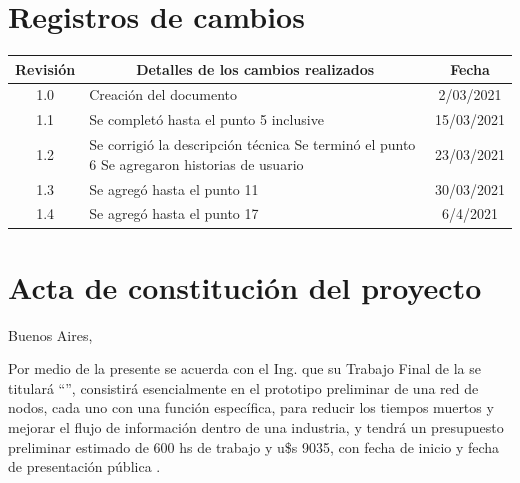 \documentclass[11pt]{charter}
\begin{document}
\maketitle
\thispagestyle{empty}
\pagebreak


\thispagestyle{empty}
{\setlength{\parskip}{0pt}
\tableofcontents{}
}
\pagebreak


\section{Registros de cambios}
\label{sec:registro}


\begin{table}[ht]
\label{tab:registro}
\centering
\begin{tabularx}{\linewidth}{@{}|c|X|c|@{}}
\hline
\rowcolor[HTML]{C0C0C0} 
Revisión & \multicolumn{1}{c|}{\cellcolor[HTML]{C0C0C0}Detalles de los cambios realizados} & Fecha      \\ \hline
1.0      & Creación del documento                                          & 2/03/2021 \\ \hline
1.1      & Se completó hasta el punto 5 inclusive & 15/03/2021 \\ \hline
1.2      & Se corrigió la descripción técnica\newline
           Se terminó el punto 6\newline
           Se agregaron historias de usuario & 23/03/2021 \\ \hline
1.3      & Se agregó hasta el punto 11      & 30/03/2021  \\ \hline
1.4     & Se agregó hasta el punto 17       & 6/4/2021 \\ \hline
\end{tabularx}
\end{table}

\pagebreak



\section{Acta de constitución del proyecto}
\label{sec:acta}

\begin{flushright}
Buenos Aires, \fechaInicioName
\end{flushright}

\vspace{2cm}

Por medio de la presente se acuerda con el Ing. \authorname\hspace{1px} que su Trabajo Final de la \degreename\hspace{1px} se titulará ``\ttitle'', consistirá esencialmente en el prototipo preliminar de una red de nodos, cada uno con una función específica, para reducir los tiempos muertos y mejorar el flujo de información dentro de una industria, y tendrá un presupuesto preliminar estimado de 600 hs de trabajo y u\$s 9035, con fecha de inicio \fechaInicioName\hspace{1px} y fecha de presentación pública \fechaFinalName.
\end{document}
